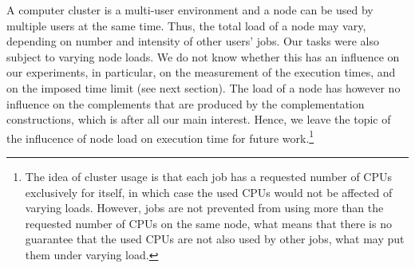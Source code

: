 A computer cluster is a multi-user environment and a node can be used by multiple users at the same time. Thus, the total load of a node may vary, depending on number and intensity of other users' jobs. Our tasks were also subject to varying node loads. We do not know whether this has an influence on our experiments, in particular, on the measurement of the execution times, and on the imposed time limit (see next section). The load of a node has however  no influence on the complements that are produced by the complementation constructions, which is after all our main interest. Hence, we leave the topic of the influcence of node load on execution time for future work.\footnote{The idea of cluster usage is that each job has a requested number of CPUs exclusively for itself, in which case the used CPUs would not be affected of varying loads. However, jobs are not prevented from using more than the requested number of CPUs on the same node, what means that there is no guarantee that the used CPUs are not also used by other jobs, what may put them under varying load.}

